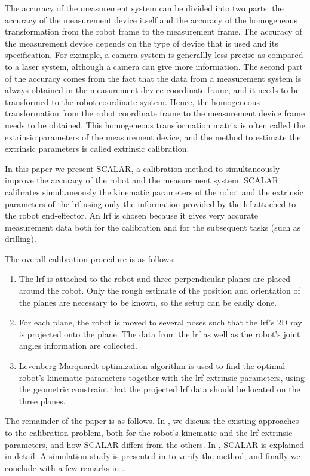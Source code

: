 The accuracy of the measurement system can be divided into two parts: the accuracy of the measurement device itself and the accuracy of the homogeneous transformation from the robot frame to the measurement frame. The accuracy of the measurement device depends on the type of device that is used and its specification. For example, a camera system is generallly less precise as compared to a laser system, although a camera can give more information. The second part of the accuracy comes from the fact that the data from a measurement system is always obtained in the measurement device coordinate frame, and it needs to be transformed to the robot coordinate system. Hence, the homogeneous transformation from the robot coordinate frame to the measurement device frame needs to be obtained. This homogeneous transformation matrix is often called the extrinsic parameters of the measurement device, and the method to estimate the extrinsic parameters is called extrinsic calibration.  

In this paper we present SCALAR, a calibration method to simultaneously improve the accuracy of the robot and the measurement system. SCALAR calibrates simultaneously the kinematic parameters of the robot and the extrinsic parameters of the \ac{lrf} using only the information provided by the \ac{lrf} attached to the robot end-effector. An \ac{lrf} is chosen because it gives very accurate measurement data both for the calibration and for the subsequent tasks (such as drilling).  

The overall calibration procedure is as follows:
\begin{enumerate}
\item The \ac{lrf} is attached to the robot and three perpendicular planes are placed around the robot. Only the rough estimate of the position and orientation of the planes are necessary to be known, so the setup can be easily done.
\item For each plane, the robot is moved to several poses such that the \ac{lrf}'s 2D ray is projected onto the plane. The data from the \ac{lrf} as well as the robot's joint angles information are collected.
\item Levenberg-Marquardt optimization algorithm is used to find the optimal robot's kinematic parameters together with the \ac{lrf} extrinsic parameters, using the geometric constraint that the projected \ac{lrf} data should be located on the three planes. 
\end{enumerate}

The remainder of the paper is as follows. In , we discuss the existing approaches to the calibration problem, both for the robot's kinematic and the \ac{lrf} extrinsic parameters, and how SCALAR differs from the others. In , SCALAR is explained in detail. A simulation study is presented in  to verify the method, and finally we conclude with a few remarks in .  



